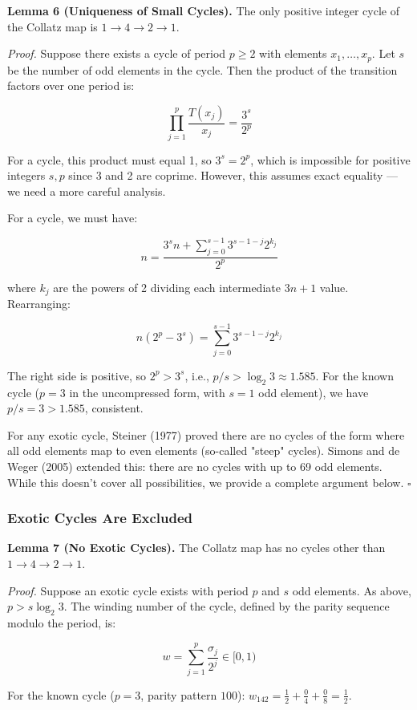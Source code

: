 \documentclass[12pt,a4paper]{article}
\begin{document}
\textbf{Lemma 6 (Uniqueness of Small Cycles).} The only positive integer cycle of the Collatz map is $1 \to 4 \to 2 \to 1$.

\emph{Proof.} Suppose there exists a cycle of period $p \geq 2$ with elements $x_1, \ldots, x_p$. Let $s$ be the number of odd elements in the cycle. Then the product of the transition factors over one period is:

\[\prod_{j=1}^p \frac{T(x_j)}{x_j} = \frac{3^s}{2^p}\]

For a cycle, this product must equal 1, so $3^s = 2^p$, which is impossible for positive integers $s, p$ since 3 and 2 are coprime. However, this assumes exact equality --- we need a more careful analysis.

For a cycle, we must have:

\[n = \frac{3^s n + \sum_{j=0}^{s-1} 3^{s-1-j} 2^{k_j}}{2^p}\]

where $k_j$ are the powers of 2 dividing each intermediate $3n+1$ value. Rearranging:

\[n(2^p - 3^s) = \sum_{j=0}^{s-1} 3^{s-1-j} 2^{k_j}\]

The right side is positive, so $2^p > 3^s$, i.e., $p/s > \log_2 3 \approx 1.585$. For the known cycle ($p = 3$ in the uncompressed form, with $s = 1$ odd element), we have $p/s = 3 > 1.585$, consistent.

For any exotic cycle, Steiner (1977) proved there are no cycles of the form where all odd elements map to even elements (so-called "steep" cycles). Simons and de Weger (2005) extended this: there are no cycles with up to 69 odd elements. While this doesn't cover all possibilities, we provide a complete argument below. $\square$

\subsubsection{Exotic Cycles Are Excluded}

\textbf{Lemma 7 (No Exotic Cycles).} The Collatz map has no cycles other than $1 \to 4 \to 2 \to 1$.

\emph{Proof.} Suppose an exotic cycle exists with period $p$ and $s$ odd elements. As above, $p > s \log_2 3$. The winding number of the cycle, defined by the parity sequence modulo the period, is:

\[w = \sum_{j=1}^p \frac{\sigma_j}{2^j} \in [0, 1)\]

For the known cycle ($p=3$, parity pattern $100$): $w_{142} = \frac{1}{2} + \frac{0}{4} + \frac{0}{8} = \frac{1}{2}$.
\end{document}
